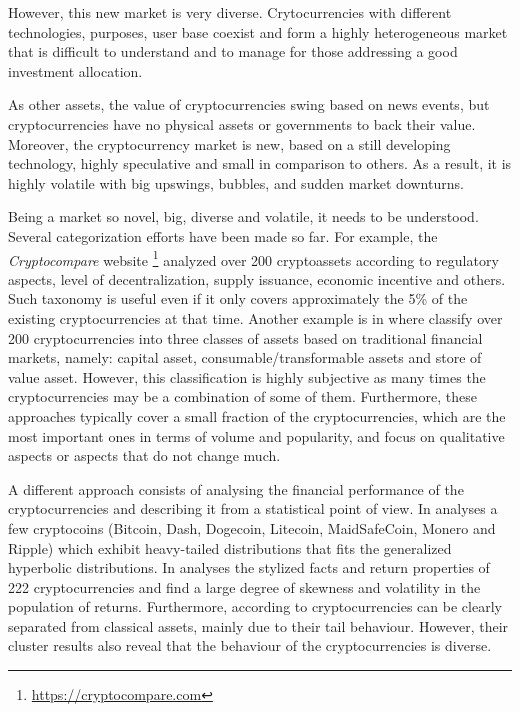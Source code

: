 \documentclass{bmcart}
\begin{document}
However, this new market is very diverse. Crytocurrencies with different technologies, purposes, user base coexist and form a highly heterogeneous market that is difficult to understand and to manage for those addressing a good investment allocation. 

As other assets, the value of cryptocurrencies swing based on news events, but cryptocurrencies have no physical assets or governments to back their value. Moreover, the cryptocurrency market is new, based on a still developing technology, highly speculative and small in comparison to others. As a result, it is highly volatile with big upswings, bubbles, and sudden market downturns. 

Being a market so novel, big, diverse and volatile, it needs to be understood. Several categorization efforts have been made so far. For example, the \textit{Cryptocompare} website  \footnote{\url{https://cryptocompare.com}} analyzed  over 200 cryptoassets according to regulatory aspects, level of decentralization, supply issuance, economic incentive and others. Such taxonomy is useful even if it only covers approximately the 5\% of the existing cryptocurrencies at that time. Another example is in \cite{CryptoAssetsChris2018} where classify over 200 cryptocurrencies into three classes of assets based on traditional financial markets, namely: capital asset, consumable/transformable assets and store of value asset. However, this classification is highly subjective as many times the cryptocurrencies may be a combination of some of them. Furthermore, these approaches typically cover a small fraction of the cryptocurrencies, which are the most important ones in terms of volume and popularity, and focus on qualitative aspects or aspects that do not change much. 

A different approach consists of analysing the financial performance of the cryptocurrencies and describing it from a statistical point of view. In \cite{StatisticalAnalysisOfCryptoc} analyses a few cryptocoins (Bitcoin, Dash, Dogecoin, Litecoin, MaidSafeCoin, Monero and Ripple) which exhibit heavy-tailed distributions  that fits the generalized hyperbolic distributions. In \cite{Hu2018CryptocurrenciesSF} analyses the stylized facts and return properties of 222 cryptocurrencies and find a large degree of skewness and volatility in the population of returns. Furthermore, according to \cite{Pele2020} cryptocurrencies can be clearly separated from classical assets, mainly due to their tail behaviour. However, their cluster results  also  reveal that the behaviour of the cryptocurrencies is diverse. 
\end{document}
